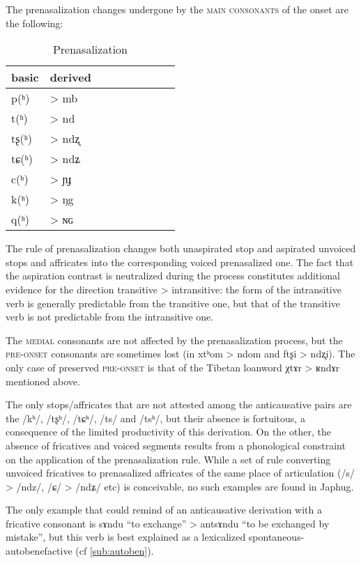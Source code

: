 \documentclass[oldfontcommands,oneside,a4paper,11pt]{memoir}
\newcommand{\ipa}[1]{{\phon #1}} %
\begin{document}
The prenasalization changes undergone by the \textsc{main consonants} of the onset are the following:
\begin{table}[H] \centering
\caption{Prenasalization} 
\begin{tabular}{lllllllll} \toprule 
basic    &  derived    &\\
\midrule
p(ʰ) & > mb\\
t(ʰ) & > nd\\
tʂ(ʰ) & > ndʐ\\
tɕ(ʰ) & > ndʑ\\
c(ʰ) & > ɲɟ\\
k(ʰ) & > ŋg\\
q(ʰ) & > ɴɢ \\
 \bottomrule
\end{tabular}
\end{table}

The rule of prenasalization changes both unaspirated stop and aspirated unvoiced stops and affricates into the corresponding voiced prenasalized one. The fact that the aspiration contrast is neutralized during the process constitutes additional evidence for the direction transitive > intransitive: the form of the intransitive verb is generally predictable from the transitive one, but that of the transitive verb is not predictable from the intransitive one. 

The \textsc{medial} consonants are not affected by the prenasalization process, but the \textsc{pre-onset} consonants are sometimes lost (in \ipa{xtʰom} > \ipa{ndom} and \ipa{ftʂi} > \ipa{ndʐi}). The only case of preserved \textsc{pre-onset} is that of the Tibetan loanword \ipa{χtɤr} > \ipa{ʁndɤr} mentioned above.

The only stops/affricates that are not attested among the anticausative pairs are the /kʰ/, /tʂʰ/, /tɕʰ/, /ts/ and /tsʰ/, but their absence is fortuitous, a consequence of the limited productivity of this derivation. On the other, the absence of fricatives and voiced segments results from a phonological constraint on the application of the prenasalization rule. While a set of rule converting unvoiced fricatives to prenasalized affricates of the same place of articulation (/s/ > /ndz/, /ɕ/ > /ndʑ/ etc) is conceivable, no such examples are found in Japhug. 

The only example that could remind of an anticausative derivation with a fricative consonant is \ipa{sɤndu} ``to exchange'' > \ipa{antsɤndu} ``to be exchanged by mistake'', but this verb is best explained as a lexicalized spontaneous-autobenefactive (cf \ref{sub:autoben}).
\end{document}
